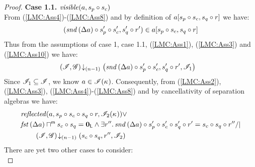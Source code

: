 \begin{lemma}
\begin{proof}
%
\noindent\textbf{Case 1.1.} $\mathit{visible}(a, s_p \circ s_c)$\\
From (\ref{LMC:Ass4})-(\ref{LMC:Ass8}) and by definition of $a[s_p \circ s_c, s_q \circ r]$ we have:
%
\begin{align}
	(\mathit{snd}\left(\Delta {a}\right) \circ s_p' \circ s_c', s_q' \circ r') \in a[s_p \circ s_c, s_q \circ r] 
	\label{LMC:Ass10}
\end{align}
%
Thus from the assumptions of case 1, case 1.1, (\ref{LMC:Ass1}), (\ref{LMC:Ass3}) and (\ref{LMC:Ass10}) we have:
%
%
\begin{align}
	& \left(\mathscr{I}, \mathscr{G}\right) \!\downarrow_{(n-1)} \left(\mathit{snd}\left(\Delta {a}\right) \circ s_{p}' \circ s_{c}', s_q' \circ r', \mathscr{I}_1\right) 
	\label{LMC:Ass11}
\end{align}
%
Since $\mathscr{I}_{1} \subseteq \mathscr{I}$, we know $a \in \mathscr{I}(\kappa_{})$. Consequently, from (\ref{LMC:Ass2}),(\ref{LMC:Ass3}), (\ref{LMC:Ass4})-(\ref{LMC:Ass8}) and by cancellativity of separation algebras we have:
\begin{align*}
	&\m{reflected}(a, s_p \composeL s_c \composeL s_q \composeL r, \lmod_{2}(\ca{})) \lor \\
	&\fst{\updateFP{a}} \maxMeetL s_c \composeL s_q = \unitL \land  \exsts{r''} \snd{\updateFP{a}} \composeL s_p' \composeL s_c' \composeL s_q' \composeL r' = s_c \composeL s_q \composeL r'' /| \null \\
	& \qquad\extendsAMUpto{\lmod, \gmod}{(n-1)}{s_c \composeL s_q}{r''}{\lmod_2}
\end{align*}
%
There are yet two other cases to consider:\\


\end{proof}
\end{lemma}
